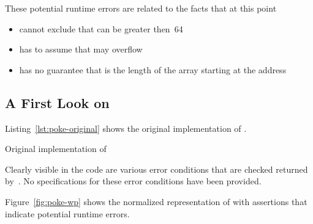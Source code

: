 These potential runtime errors are related to the facts that at this point \framacwp
\begin{itemize}
\item cannot exclude that  can be greater then~64 
\item has to assume that  may overflow
\item has no guarantee that  is the length 
      of the array starting at the address 
\end{itemize}

\clearpage

\subsection{A First Look on \poke}

Listing~\ref{lst:poke-original} shows the original implementation of \poke.

\begin{listing}[hbt]
\begin{minipage}{\textwidth}

\end{minipage}
\caption{\label{lst:poke-original} Original implementation of \poke}
\end{listing}

Clearly visible in the code are various error conditions that are checked 
returned by~\poke.
No specifications for these error conditions have been provided.
 
\clearpage


Figure~\ref{fig:poke-wp} shows the normalized representation of \poke
with \acsl assertions that indicate potential runtime errors.


